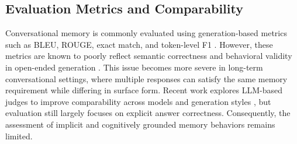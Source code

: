 \documentclass[11pt]{article}
\begin{document}
\subsection{Evaluation Metrics and Comparability}
Conversational memory is commonly evaluated using generation-based metrics
such as BLEU, ROUGE, exact match, and token-level F1
\cite{papineni2002bleu,lin2004rouge,post2018call,rajpurkar2018know}.
However, these metrics are known to poorly reflect semantic correctness
and behavioral validity in open-ended generation
\cite{novikova2017we,post2018call,bulian2022tomayto}.
This issue becomes more severe in long-term conversational settings,
where multiple responses can satisfy the same memory requirement while
differing in surface form.
Recent work explores LLM-based judges to improve comparability across
models and generation styles
\cite{zheng2023judging,li2024llms,li2025generation}, but evaluation still
largely focuses on explicit answer correctness.
Consequently, the assessment of implicit and cognitively grounded memory
behaviors remains limited.




\end{document}
